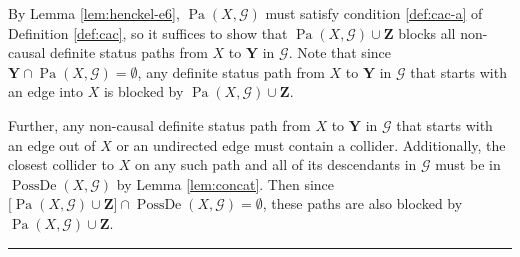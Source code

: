 \documentclass[twoside]{article}
\DeclareMathOperator{\Pa}{Pa}
\DeclareMathOperator{\PossDe}{PossDe}
\newcommand{\mb}[1]{\mathbf{#1}}
\newcommand{\g}[1][G]{\mathcal{#1}}
\newenvironment{proofof}[1][]{\begin{trivlist}
\item[\hskip \labelsep {\bfseries Proof of #1.}]}{\hfill\BlackBox\end{trivlist}}
\newcommand{\BlackBox}{\rule{1.5ex}{1.5ex}}
\begin{document}
\begin{proofof}[Lemma \ref{lem:parent-set}]
    By Lemma \ref{lem:henckel-e6}, $\Pa(X, \g)$ must satisfy condition \ref{def:cac-a} of Definition \ref{def:cac}, so it suffices to show that $\Pa(X, \g) \cup \mb{Z}$ blocks all non-causal definite status paths from $X$ to $\mb{Y}$ in $\g$. Note that since $\mb{Y} \cap \Pa(X, \g) = \emptyset$, any definite status path from $X$ to $\mb{Y}$ in $\g$ that starts with an edge into $X$ is blocked by $\Pa(X, \g) \cup \mb{Z}$. 
    
    Further, any non-causal definite status path from $X$ to $\mb{Y}$ in $\g$ that starts with an edge out of $X$ or an undirected edge must contain a collider. Additionally, the closest collider to $X$ on any such path and all of its descendants in $\g$ must be in $\PossDe(X, \g)$  by Lemma \ref{lem:concat}. Then since $\big[ \Pa(X, \g) \cup \mb{Z} \big] \cap \PossDe(X, \g) = \emptyset$, these paths are also blocked by $\Pa(X, \g) \cup \mb{Z}$.
\end{proofof}
\end{document}
